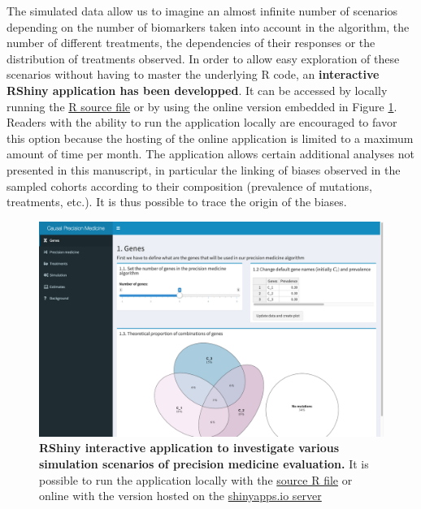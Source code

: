 \documentclass[a4paper,12pt,twoside,onecolumn,openright,final,oldfontcommands]{memoir}
\begin{document}
The simulated data allow us to imagine an almost infinite number of
scenarios depending on the number of biomarkers taken into account in
the algorithm, the number of different treatments, the dependencies of
their responses or the distribution of treatments observed. In order to
allow easy exploration of these scenarios without having to master the
underlying R code, an \textbf{interactive RShiny application has been
developped}. It can be accessed by locally running the
\href{https://github.com/JonasBeal/Causal_Precision_Medicine/blob/master/Application_Causal_PM.R}{R
source file} or by using the online version embedded in Figure
\ref{fig:Shiny}. Readers with the ability to run the application locally
are encouraged to favor this option because the hosting of the online
application is limited to a maximum amount of time per month. The
application allows certain additional analyses not presented in this
manuscript, in particular the linking of biases observed in the sampled
cohorts according to their composition (prevalence of mutations,
treatments, etc.). It is thus possible to trace the origin of the
biases.

\begin{figure}

{\centering \includegraphics[width=0.9\linewidth]{fig/screenshot-shiny} 

}

\caption[RShiny interactive application to investigate various simulation scenarios of precision medicine evaluation]{\textbf{RShiny interactive application to
investigate various simulation scenarios of precision medicine
evaluation.} It is possible to run the application locally with the
\href{https://github.com/JonasBeal/Causal_Precision_Medicine/blob/master/Application_Causal_PM.R}{source
R file} or online with the version hosted on the
\href{https://jonasbeal.shinyapps.io/application_causal_pm/}{shinyapps.io
server}}\label{fig:Shiny}
\end{figure}
\end{document}
